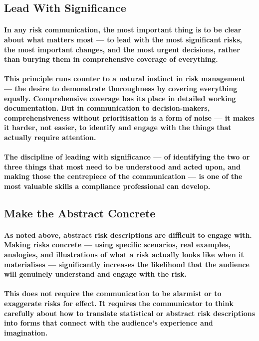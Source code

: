 \subsection{Lead With Significance}
\paragraph{In any risk communication, the most important thing is to be clear about what matters most — to lead with the most significant risks, the most important changes, and the most urgent decisions, rather than burying them in comprehensive coverage of everything.}
\paragraph{This principle runs counter to a natural instinct in risk management — the desire to demonstrate thoroughness by covering everything equally. Comprehensive coverage has its place in detailed working documentation. But in communication to decision-makers, comprehensiveness without prioritisation is a form of noise — it makes it harder, not easier, to identify and engage with the things that actually require attention.}
\paragraph{The discipline of leading with significance — of identifying the two or three things that most need to be understood and acted upon, and making those the centrepiece of the communication — is one of the most valuable skills a compliance professional can develop.}

\subsection{Make the Abstract Concrete}
\paragraph{As noted above, abstract risk descriptions are difficult to engage with. Making risks concrete — using specific scenarios, real examples, analogies, and illustrations of what a risk actually looks like when it materialises — significantly increases the likelihood that the audience will genuinely understand and engage with the risk.}
\paragraph{This does not require the communication to be alarmist or to exaggerate risks for effect. It requires the communicator to think carefully about how to translate statistical or abstract risk descriptions into forms that connect with the audience's experience and imagination.}

